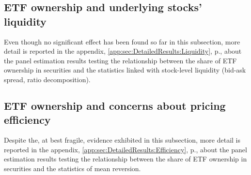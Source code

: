 \subsection{ETF ownership and underlying stocks' liquidity}
\label{sec:Results:sub:Liquidity}


\begin{landscape}
  {\linespread{1.0}
    \begin{table}[htbp]
      
    \end{table}
  }
\end{landscape}

Even though no significant effect has been found so far in this subsection, more detail is reported in the appendix, \autoref{app:sec:DetailedResults:Liquidity}, p.\pageref{app:sec:DetailedResults:Liquidity},  about the panel estimation results testing the relationship between the share of ETF ownership in securities and the statistics linked with stock-level liquidity (bid-ask spread, \textcite{Amihud2002} ratio decomposition).
\subsection{ETF ownership and concerns about pricing efficiency}
\label{sec:Results:sub:Efficiency}

\begin{landscape}
  {\linespread{1.0}
    \begin{table}[htbp]
      
    \end{table}
  }
\end{landscape}

Despite the, at best fragile, evidence exhibited in this subsection, more detail is reported in the appendix, \autoref{app:sec:DetailedResults:Efficiency}, p.\pageref{app:sec:DetailedResults:Efficiency}, about the panel estimation results testing the relationship between the share of ETF ownership in securities and the statistics of mean reversion.
